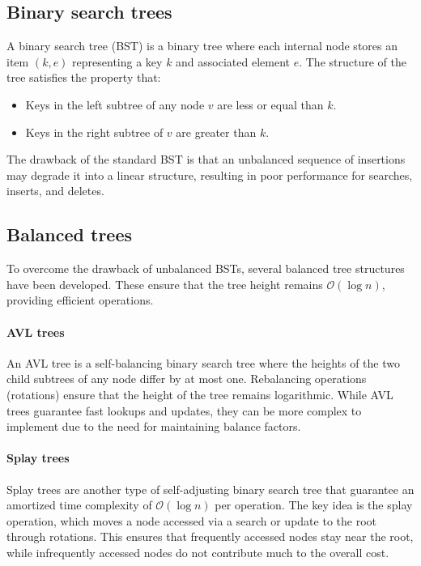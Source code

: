 \subsection{Binary search trees}
A binary search tree (BST) is a binary tree where each internal node stores an item $(k, e)$ representing a key $k$ and associated element $e$. 
The structure of the tree satisfies the property that: 
\begin{itemize} 
    \item Keys in the left subtree of any node $v$ are less or equal than $k$. 
    \item Keys in the right subtree of $v$ are greater than $k$. 
\end{itemize}
The drawback of the standard BST is that an unbalanced sequence of insertions may degrade it into a linear structure, resulting in poor performance for searches, inserts, and deletes.

\subsection{Balanced trees}
To overcome the drawback of unbalanced BSTs, several balanced tree structures have been developed. 
These ensure that the tree height remains $\mathcal{O}(\log n)$, providing efficient operations.

\paragraph*{AVL trees}
An AVL tree is a self-balancing binary search tree where the heights of the two child subtrees of any node differ by at most one. 
Rebalancing operations (rotations) ensure that the height of the tree remains logarithmic. 
While AVL trees guarantee fast lookups and updates, they can be more complex to implement due to the need for maintaining balance factors.

\paragraph*{Splay trees}
Splay trees are another type of self-adjusting binary search tree that guarantee an amortized time complexity of $\mathcal{O}(\log n)$ per operation. 
The key idea is the splay operation, which moves a node accessed via a search or update to the root through rotations. 
This ensures that frequently accessed nodes stay near the root, while infrequently accessed nodes do not contribute much to the overall cost.

